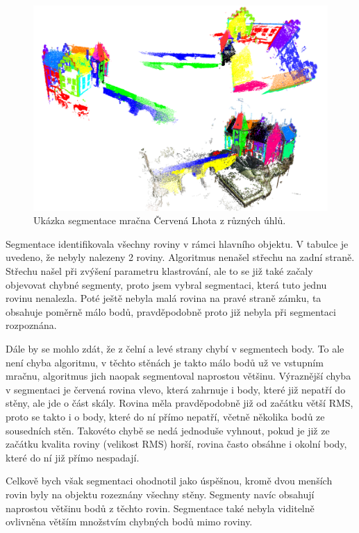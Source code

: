 \documentclass[11pt,twoside,a4paper]{book}
\begin{document}
\begin{figure}[ht]
\begin{center}
\includegraphics[width=\textwidth]{figures/test-cl}
\caption{Ukázka segmentace mračna Červená Lhota z různých úhlů.}
\label{fig:test-cl}
\end{center}
\end{figure}

Segmentace identifikovala všechny roviny v rámci hlavního objektu. V tabulce je uvedeno, že nebyly nalezeny 2 roviny. Algoritmus nenašel střechu na zadní straně. Střechu našel při zvýšení parametru klastrování, ale to se již také začaly objevovat chybné segmenty, proto jsem vybral segmentaci, která tuto jednu rovinu nenalezla. Poté ještě nebyla malá rovina na pravé straně zámku, ta obsahuje poměrně málo bodů, pravděpodobně proto již nebyla při segmentaci rozpoznána.

Dále by se mohlo zdát, že z čelní a levé strany chybí v segmentech body. To ale není chyba algoritmu, v těchto stěnách je takto málo bodů už ve vstupním mračnu, algoritmus jich naopak segmentoval naprostou většinu. Výraznější chyba v segmentaci je červená rovina vlevo, která zahrnuje i body, které již nepatří do stěny, ale jde o část skály. Rovina měla pravděpodobně již od začátku větší RMS, proto se takto  i o body, které do ní přímo nepatří, včetně několika bodů ze sousedních stěn. Takovéto chybě se nedá jednoduše vyhnout, pokud je již ze začátku kvalita roviny (velikost RMS) horší, rovina často obsáhne i okolní body, které do ní již přímo nespadají.

Celkově bych však segmentaci ohodnotil jako úspěšnou, kromě dvou menších rovin byly na objektu rozeznány všechny stěny. Segmenty navíc obsahují naprostou většinu bodů z těchto rovin. Segmentace také nebyla viditelně ovlivněna větším množstvím chybných bodů mimo roviny.
\end{document}
